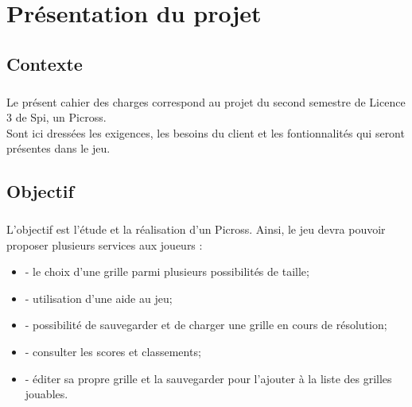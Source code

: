 
\newcommand{\titre}{Cahier des charges}



\maketitle



\chapter{Présentation du projet}


\section{Contexte}
\paragraph*{}
Le présent cahier des charges correspond au projet du second semestre de Licence 3 de Spi, un Picross.\\
Sont ici dressées les exigences, les besoins du client et les fontionnalités qui seront présentes dans le jeu.


\section{Objectif}
\paragraph*{}
L'objectif est l'étude et la réalisation d'un Picross. Ainsi, le jeu devra pouvoir proposer plusieurs services aux joueurs :
\begin{itemize}
\item - le choix d'une grille parmi plusieurs possibilités de taille;
\item - utilisation d'une aide au jeu;
\item - possibilité de sauvegarder et de charger une grille en cours de résolution;
\item - consulter les scores et classements;
\item - éditer sa propre grille et la sauvegarder pour l'ajouter à la liste des grilles jouables.
\end{itemize}


